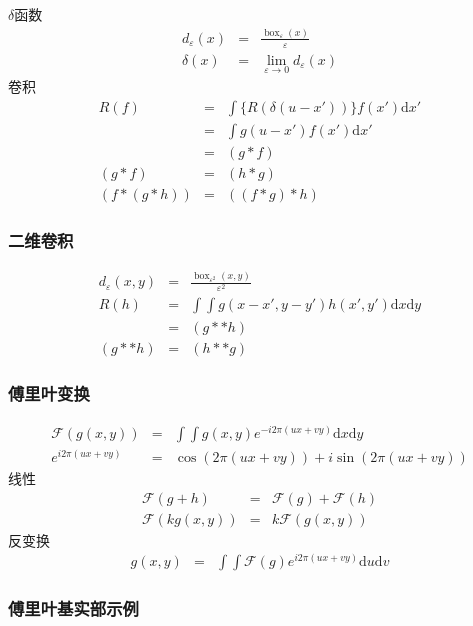 \documentclass{beamer}
\newcommand{\mathd}{\mathrm{d}}
\newcommand{\nospace}{}
\newcommand{\tmop}[1]{\ensuremath{\operatorname{#1}}}
\newcommand{\nonconverted}[1]{\mbox{}}
\begin{document}
{{\begin{frame}
  $\delta$函数
  \begin{eqnarray*}
    d_{\varepsilon} (x) & = & \frac{\tmop{box}_{\varepsilon}
    (x)}{\varepsilon}\\
    \delta (x) & = & \lim_{\varepsilon \rightarrow 0} d_{\varepsilon} (x)
  \end{eqnarray*}
  卷积
  \begin{eqnarray*}
    R (f) & = & \int \{ R (\delta (u - x')) \} f (x') \mathd x'\\
    & = & \int g (u - x') f (x') \mathd x'\\
    & = & (g \ast f)\\
    (g \ast f) & = & (h \ast g)\\
    (f \ast (g \ast h)) & = & ((f \ast g) \ast h)
  \end{eqnarray*}
\end{frame}}{\begin{frame}
  \frametitle{二维卷积}
  \begin{eqnarray*}
    d_{\varepsilon} (x, y) & = & \frac{\tmop{box}_{\varepsilon^2} (x,
    y)}{\varepsilon^2}\\
    R (h) & = & \int \int g (x - x', y - y') h (x', y') \mathd x \mathd y\\
    & = & (g \ast \ast h)\\
    (g \ast \ast h) & = & (h \ast \ast g)
  \end{eqnarray*}
\end{frame}}{\begin{frame}
  \frametitle{傅里叶变换}
  
  
  \begin{eqnarray*}
    \mathcal{F} (g (x, y)) & = & \int \int g (x, y) e^{- i 2 \pi (u \nospace x
    + v \nospace y)} \mathd x \mathd y\\
    e^{\nonconverted{minus} i 2 \pi (u \nospace x + v \nospace y)} & = & \cos
    (2 \pi (u \nospace x + v \nospace y)) + i \nospace \sin (2 \pi (u \nospace
    x + v \nospace y))
  \end{eqnarray*}
  线性
  \begin{eqnarray*}
    \mathcal{F} (g + h) & = & \mathcal{F} (g) +\mathcal{F} (h)\\
    \mathcal{F} (k \nospace g (x, y)) & = & k\mathcal{F} (g (x, y))
  \end{eqnarray*}
  反变换
  \begin{eqnarray*}
    g (x, y) & = & \int \int \mathcal{F} (g) e^{i 2 \pi (u \nospace x + v
    \nospace y)} \mathd u \mathd v
  \end{eqnarray*}
\end{frame}}{\begin{frame}
  \frametitle{傅里叶基实部示例}
  

\end{frame}}}
\end{document}
